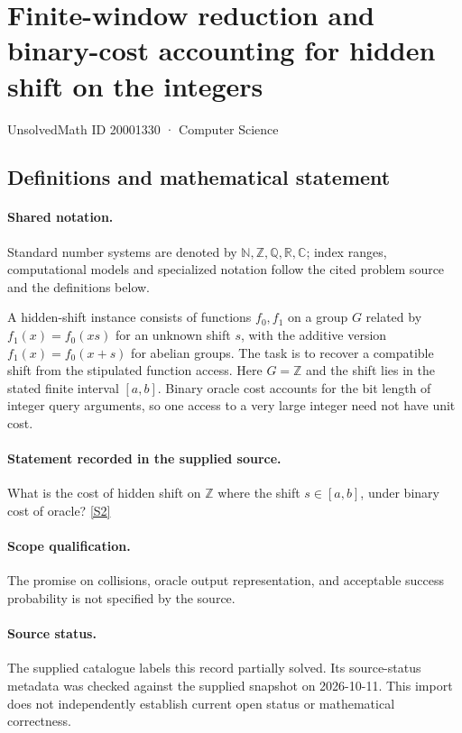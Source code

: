 \documentclass[11pt]{article}
\newcommand{\sref}[2]{\hyperlink{source:#1:#2}{[S#2]}}
\begin{document}
\setcounter{section}{20001329}
\section{Finite-window reduction and binary-cost accounting for hidden shift on the integers}\label{20001330}
{\small\sffamily UnsolvedMath ID 20001330 · Computer Science}
\subsection{Definitions and mathematical statement}

\paragraph{Shared notation.}Standard number systems are denoted by $\mathbb N,\mathbb Z,\mathbb Q,\mathbb R,\mathbb C$; index ranges, computational models and specialized notation follow the cited problem source and the definitions below.


A hidden-shift instance consists of functions $f_0,f_1$ on a group $G$ related by $f_1(x)=f_0(xs)$ for an unknown shift $s$, with the additive version $f_1(x)=f_0(x+s)$ for abelian groups. The task is to recover a compatible shift from the stipulated function access. Here $G=\mathbb Z$ and the shift lies in the stated finite interval $[a,b]$. Binary oracle cost accounts for the bit length of integer query arguments, so one access to a very large integer need not have unit cost.
\paragraph{Statement recorded in the supplied source.}
What is the cost of hidden shift on $\mathbb Z$ where the shift $s\in [a,b]$, under binary cost of oracle? \sref{20001330}{2}
\paragraph{Scope qualification.}
The promise on collisions, oracle output representation, and acceptable success probability is not specified by the source.
\paragraph{Source status.}
The supplied catalogue labels this record partially solved. Its source-status metadata was checked against the supplied snapshot on 2026-10-11. This import does not independently establish current open status or mathematical correctness.
\end{document}
